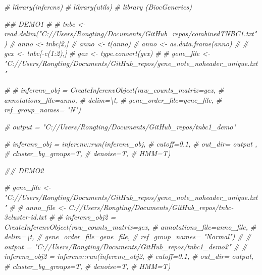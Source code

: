 \documentclass[
]{book}
\newenvironment{Shaded}{\begin{snugshade}}{\end{snugshade}}
\newcommand{\CommentTok}[1]{\textcolor[rgb]{0.56,0.35,0.01}{\textit{#1}}}
\begin{document}
\begin{Shaded}
\begin{Highlighting}[]
\CommentTok{\# library(infercnv)}
\CommentTok{\# library(utils)}
\CommentTok{\# library (BiocGenerics)}

\CommentTok{\#\# DEMO1}
\CommentTok{\# }
\CommentTok{\# tnbc \textless{}{-} read.delim("C://Users/Rongting/Documents/GitHub\_repos/combinedTNBC1.txt")}
\CommentTok{\# anno \textless{}{-} tnbc[2,]}
\CommentTok{\# anno \textless{}{-} t(anno)}
\CommentTok{\# anno \textless{}{-} as.data.frame(anno)}
\CommentTok{\# }
\CommentTok{\# gex \textless{}{-} tnbc[{-}c(1:2),]}
\CommentTok{\# gex \textless{}{-} type.convert(gex)}
\CommentTok{\# }
\CommentTok{\# gene\_file \textless{}{-} "C://Users/Rongting/Documents/GitHub\_repos/gene\_note\_noheader\_unique.txt"}

\CommentTok{\# }
\CommentTok{\# infercnv\_obj = CreateInfercnvObject(raw\_counts\_matrix=gex,}
\CommentTok{\#                                     annotations\_file=anno,}
\CommentTok{\#                                     delim=\textquotesingle{}\textbackslash{}t\textquotesingle{},}
\CommentTok{\#                                     gene\_order\_file=gene\_file,}
\CommentTok{\#                                     ref\_group\_names= "N")}

\CommentTok{\# output = "C://Users/Rongting/Documents/GitHub\_repos/tnbc1\_demo"}

\CommentTok{\# infercnv\_obj = infercnv::run(infercnv\_obj,}
\CommentTok{\#                              cutoff=0.1,  }
\CommentTok{\#                              out\_dir= output , }
\CommentTok{\#                              cluster\_by\_groups=T,   }
\CommentTok{\#                              denoise=T,}
\CommentTok{\#                              HMM=T)}

\CommentTok{\#\# DEMO2}

\CommentTok{\# gene\_file \textless{}{-} "C://Users/Rongting/Documents/GitHub\_repos/gene\_note\_noheader\_unique.txt"}
\CommentTok{\# }
\CommentTok{\# anno\_file \textless{}{-} \textquotesingle{}C://Users/Rongting/Documents/GitHub\_repos/tnbc{-}3cluster{-}id.txt\textquotesingle{}}
\CommentTok{\# }
\CommentTok{\# infercnv\_obj2 = CreateInfercnvObject(raw\_counts\_matrix=gex,}
\CommentTok{\#                                     annotations\_file=anno\_file,}
\CommentTok{\#                                     delim=\textquotesingle{}\textbackslash{}t\textquotesingle{},}
\CommentTok{\#                                     gene\_order\_file=gene\_file,}
\CommentTok{\#                                     ref\_group\_names= "Normal")}
\CommentTok{\# }
\CommentTok{\# output = "C://Users/Rongting/Documents/GitHub\_repos/tnbc1\_demo2"}
\CommentTok{\# }
\CommentTok{\# infercnv\_obj2 = infercnv::run(infercnv\_obj2,}
\CommentTok{\#                              cutoff=0.1,}
\CommentTok{\#                              out\_dir= output,}
\CommentTok{\#                              cluster\_by\_groups=T,}
\CommentTok{\#                              denoise=T,}
\CommentTok{\#                              HMM=T)}
\end{Highlighting}
\end{Shaded}
\end{document}
